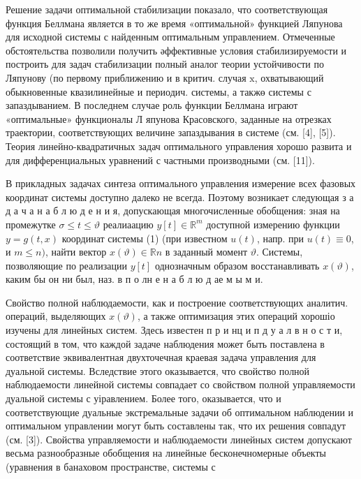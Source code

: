 \documentclass[10pt]{article}
\begin{document}
Решение задачи оптимальной стабилизации показало, что соответствующая функция Беллмана является в то же время «оптимальной» функцией Ляпунова для исходной системы с найденным оптимальным управлением. Отмеченные обстоятельства позволили получить әффективные условия стабилизируемости и построить для задач стабилизации полный аналог теории устойчивости по Ляпунову (по первому приближению и в критич. случая $\mathrm{x}$, охватывающий обыкновенные квазилинейные и периодич. системы, а такжө системы с запаздыванием. В последнем случае роль функции Беллмана играют «оптимальные» функционалы Л япунова Красовского, заданные на отрезках траектории, соответствующих величине запаздывания в системе (см. [4], [5]). Теория линейно-квадратичных задач оптимального управления хорошо развита и для дифференциальных уравнений с частными производными (см. [11]).

В прикладных задачах синтеза оптимального управления измерение всех фазовых координат системы доступно далеко не всегда. Поэтому возникает следующая з а д а ч а н а б л ю д е н и я, допускающая многочисленные обобщения: зная на промежутке $\sigma \leqslant t \leqslant \vartheta$ реалиаацию $y[t] \in \mathbb{R}^{m}$ доступной измерению функции $y=g(t, x)$ координат системы (1) (при известном $u(t)$, напр. при $u(t) \equiv 0$, и $m \leqslant n)$, найти вектор $x(\vartheta) \in \mathbb{R} n$ в заданный момент $\mathfrak{\vartheta}$. Системы, позволяющие по реализации $y[t]$ однозначным образом восстанавливать $x(\vartheta)$, каким бы он ни был, наз. в п о лн е н а б л ю д ае м ы м и.

Свойство полной наблюдаемости, как и построение соответствующих аналитич. операций, выделяющих $x(\vartheta)$, а также оптимизация этих операций хорошіо изучены для линейных систем. Здесь известен п р и нц и п д у а л в н о с т и, состоящий в том, что каждой задаче наблюдения может быть поставлена в соответствие эквивалентная двухточечная краевая задача управления для дуальной системы. Вследствие этого оказывается, что свойство полной наблюдаемости линейной системы совпадает со свойством полной управляемости дуальной системы с уіравлением. Более того, оказывается, что и соответствующие дуальные экстремальные задачи об оптимальном наблюдении и оптимальном управлении могут быть составлены так, что их решения совпадут (см. [3]). Свойства управляемости и наблюдаемости линейных систем допускают весьма разнообразные обобщения на линейные бесконечномерные объекты (уравнения в банаховом пространстве, системы с
\end{document}

